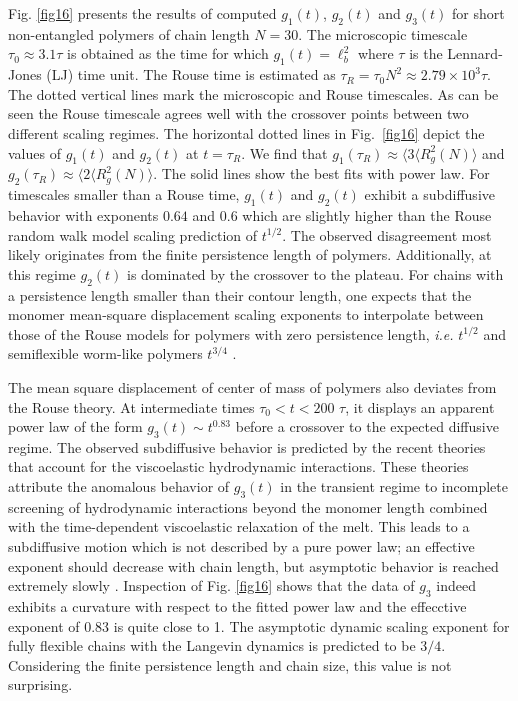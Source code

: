 \documentclass[pre,showpacs,notitlepage,twocolumn]{revtex4-1}
\begin{document}
Fig. \ref{fig16} presents the results  of computed $g_1(t)$, $g_2(t)$ and $g_3(t)$  for  short non-entangled polymers of chain length $N=30$.
   The microscopic timescale  $\tau_0 \approx 3.1 \tau $   is obtained as the time for which $g_1(t)= \ell_b^2$ where $\tau$ is the Lennard-Jones (LJ) time unit. The Rouse time is estimated as $\tau_R = \tau_0 N ^2 \approx 2.79 \times 10^3 \tau$.  The dotted vertical lines mark the microscopic and Rouse timescales.  As can be seen the Rouse timescale  agrees well with the crossover points between two different scaling regimes.
  The horizontal dotted lines in Fig.~\ref{fig16} depict the  values of  $g_1(t)$ and $g_2(t)$ at $t=\tau_R$. We find that $g_1(\tau_R)\approx  \langle 3⟨R^2_g(N)\rangle $ and $g_2(\tau_R)\approx  \langle 2⟨R^2_g(N)\rangle$. The  solid lines show the best fits   with  power law. For timescales smaller than a Rouse time,  $g_1(t)$ and $g_2(t)$  exhibit a subdiffusive behavior with exponents $0.64$ and  $0.6$  which are slightly higher than 
  the Rouse random walk model scaling prediction of $t^{1/2}$.   The observed disagreement most likely originates from the finite persistence length of polymers. Additionally, at this regime $g_2(t)$  is dominated by the crossover to the plateau. For chains with a persistence length smaller than their contour length, one expects that the monomer mean-square displacement scaling exponents to interpolate between those of the Rouse models for  polymers with zero persistence length, {\it i.e.} $t^{1/2}$  \cite{polymerDoi,Rubinstein}  and semiflexible worm-like polymers $t^{3/4}$ \cite{Barkema2014}. 
  
  
 The mean square displacement of center of mass of polymers also deviates from the Rouse theory. At intermediate times  $  \tau_0 < t < 200$ $\tau$, it  displays  an apparent power law of the form $g_3(t) \sim t^{0.83}$ before a crossover to the expected diffusive regime. The observed subdiffusive behavior is predicted by the recent theories ~\cite{Farago1,Farago2} that account for the viscoelastic hydrodynamic interactions.  These theories attribute the anomalous behavior of $g_3(t)$ in the transient regime to incomplete screening of hydrodynamic interactions beyond the monomer length combined with the time-dependent viscoelastic relaxation of the melt. This leads to a subdiffusive motion which is not described by a pure power law; an effective exponent should decrease with chain length, but asymptotic behavior is reached extremely slowly \cite{Farago1,Farago2}. Inspection of Fig. \ref{fig16} shows that the data of $g_3$ indeed exhibits a curvature with respect to the fitted power law and the effecctive exponent of 0.83 is  quite close to 1.  The  asymptotic dynamic scaling exponent for  fully flexible chains with the Langevin dynamics is predicted to be $3/4 $. Considering the finite persistence length  and chain size,  this value is not surprising.
 
\end{document}
